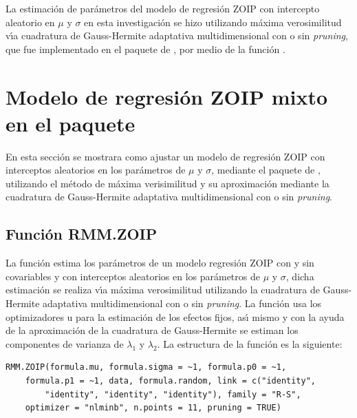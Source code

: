La estimaci\'{o}n de pa\-r\'{a}\-me\-tros del modelo de regresi\'{o}n ZOIP con intercepto aleatorio en $\mu$ y $\sigma$ en esta investigaci\'{o}n se hizo utilizando m\'{a}xima verosimilitud v\'{\i}a cuadratura de Gauss-Hermite adaptativa multidimensional con o sin \textit{pruning}, que fue implementado en el paquete  de , por medio de la funci\'{o}n .


\section{Modelo de regresi\'{o}n ZOIP mixto en el paquete }

En esta secci\'{o}n se mostrara como ajustar un modelo de regresi\'{o}n ZOIP con interceptos aleatorios en los par\'{a}metros de $\mu$ y $\sigma$, mediante el paquete  de , utilizando el m\'{e}todo de m\'{a}xima verisimilitud y su aproximaci\'{o}n mediante la cuadratura de Gauss-Hermite adaptativa multidimensional con o sin \textit{pruning}.

\subsection{Funci\'{o}n RMM.ZOIP} 

La funci\'{o}n  estima los par\'{a}metros de un modelo regresi\'{o}n ZOIP con y sin covariables y con interceptos aleatorios en los par\'{a}metros de $\mu$ y $\sigma$, dicha estimaci\'{o}n se realiza v\'{\i}a m\'{a}xima verosimilitud utilizando la cuadratura de Gauss-Hermite adaptativa multidimensional con o sin \textit{pruning}. La funci\'{o}n  usa los optimizadores  u  para la estimaci\'{o}n de los efectos fijos, as\'{\i} mismo y con la ayuda de la aproximaci\'{o}n de la cuadratura de Gauss-Hermite se estiman los componentes de varianza de $\lambda_1$ y $\lambda_2$. La estructura de la funci\'{o}n  es la siguiente:

\begin{verbatim}
RMM.ZOIP(formula.mu, formula.sigma = ~1, formula.p0 = ~1, 
    formula.p1 = ~1, data, formula.random, link = c("identity", 
        "identity", "identity", "identity"), family = "R-S", 
    optimizer = "nlminb", n.points = 11, pruning = TRUE)
\end{verbatim}

